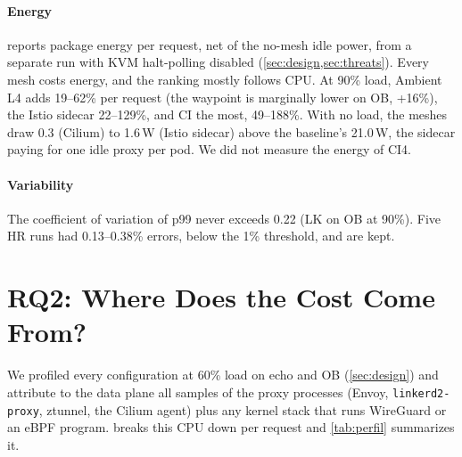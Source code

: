 \paragraph{Energy}
 reports package energy per request, net of the no-mesh idle
power, from a separate run with KVM halt-polling disabled (\cref{sec:design,sec:threats}). Every mesh costs energy, and the ranking mostly follows CPU. At
90\% load, Ambient L4 adds 19--62\% per request (the waypoint is marginally
lower on OB, +16\%), the Istio sidecar 22--129\%, and CI the most, 49--188\%.
With no load, the meshes draw 0.3 (Cilium) to 1.6\,W (Istio sidecar)
above the baseline's 21.0\,W, the sidecar paying for one idle proxy per pod. We did not measure the energy of CI4.

\begin{table}[t]
  \centering
  \caption{Package energy per request (mJ), net of the no-mesh idle power,
           with KVM halt-polling disabled (median of 3 runs).}
  \label{tab:energy}
  \footnotesize
  \setlength{\tabcolsep}{2.5pt}
  
\end{table}

\paragraph{Variability}
The coefficient of variation of p99 never exceeds 0.22 (LK on OB at 90\%).
Five HR runs had 0.13--0.38\% errors, below the 1\% threshold, and are kept.

\section{RQ2: Where Does the Cost Come From?}
\label{sec:rq2}

We profiled every configuration at 60\% load on echo and OB
(\cref{sec:design}) and attribute to the data plane all samples of the proxy
processes (Envoy, \texttt{linkerd2-proxy}, ztunnel, the Cilium agent) plus any
kernel stack that runs WireGuard or an eBPF program. 
breaks this CPU down per request and \cref{tab:perfil} summarizes it.

